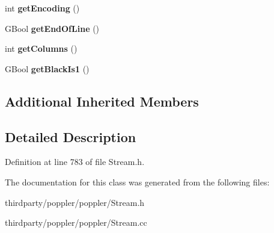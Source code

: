 \begin{DoxyCompactItemize}
int {\bfseries get\+Encoding} ()
\item 
\mbox{\label{class_c_c_i_t_t_fax_stream_a1dfa8be7d14a750f78466ba3c2e3bf36}} 
G\+Bool {\bfseries get\+End\+Of\+Line} ()
\item 
\mbox{\label{class_c_c_i_t_t_fax_stream_a2e019f68c6cac73b0da381dd6b67152b}} 
int {\bfseries get\+Columns} ()
\item 
\mbox{\label{class_c_c_i_t_t_fax_stream_ad7bc7888509260851fef0e8b6118c430}} 
G\+Bool {\bfseries get\+Black\+Is1} ()
\end{DoxyCompactItemize}
\subsection*{Additional Inherited Members}


\subsection{Detailed Description}


Definition at line 783 of file Stream.\+h.



The documentation for this class was generated from the following files\+:\begin{DoxyCompactItemize}
\item 
thirdparty/poppler/poppler/Stream.\+h\item 
thirdparty/poppler/poppler/Stream.\+cc\end{DoxyCompactItemize}
